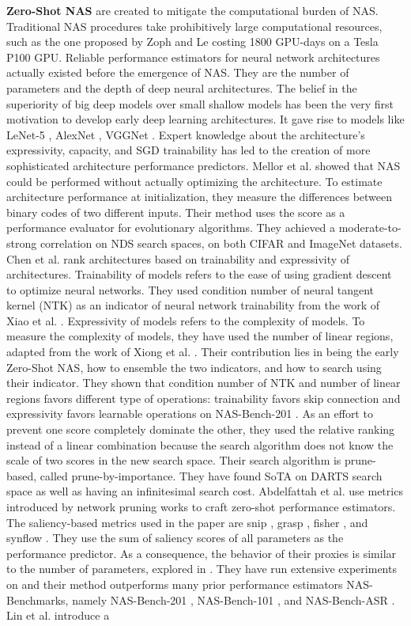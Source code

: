 \documentclass[lettersize,journal]{IEEEtran}
\begin{document}
\textbf {Zero-Shot NAS} are created to mitigate the computational burden of NAS. Traditional NAS procedures take prohibitively large computational resources, such as the one proposed by Zoph and Le \cite{rl1} costing 1800 GPU-days on a Tesla P100 GPU. Reliable performance estimators for neural network architectures actually existed before the emergence of NAS. They are the number of parameters and the depth of deep neural architectures. The belief in the superiority of big deep models over small shallow models has been the very first motivation to develop early deep learning architectures. It gave rise to models like LeNet-5 \cite{lenet}, AlexNet \cite{alexnet}, VGGNet \cite{vgg}. Expert knowledge about the architecture's expressivity, capacity, and SGD trainability has led to the creation of more sophisticated architecture performance predictors. Mellor et al. \cite{naswot} showed that NAS could be performed without actually optimizing the architecture. To estimate architecture performance at initialization, they measure the differences between binary codes of two different inputs. Their method uses the score as a performance evaluator for evolutionary algorithms. They achieved a moderate-to-strong correlation on NDS search spaces, on both CIFAR and ImageNet datasets. Chen et al. \cite{TE-NAS} rank architectures based on trainability and expressivity of architectures. Trainability of models refers to the ease of using gradient descent to optimize neural networks. They used condition number of neural tangent kernel (NTK) as an indicator of neural network trainability from the work of Xiao et al. \cite{Disentangling}. Expressivity of models refers to the complexity of models. To measure the complexity of models, they have used the number of linear regions, adapted from the work of Xiong et al. \cite{linearregion}. Their contribution lies in being the early Zero-Shot NAS, how to ensemble the two indicators, and how to search using their indicator. They shown that condition number of NTK and number of linear regions favors different type of operations: trainability favors skip connection and expressivity favors learnable operations on NAS-Bench-201 \cite{nb201}. As an effort to prevent one score completely dominate the other, they used the relative ranking instead of a linear combination because the search algorithm does not know the scale of two scores in the new search space. Their search algorithm is prune-based, called prune-by-importance. They have found SoTA on DARTS search space \cite{DARTS} as well as having an infinitesimal search cost. Abdelfattah et al. \cite{LightweightNAS} use metrics introduced by network pruning works to craft zero-shot performance estimators. The saliency-based metrics used in the paper are snip \cite{snip}, grasp \cite{grasp}, fisher \cite{fisher}, and synflow \cite{synflow}. They use the sum of saliency scores of all parameters as the performance predictor. As a consequence, the behavior of their proxies is similar to the number of parameters, explored in \cite{deeperlookzerocost}. They have run extensive experiments on and their method outperforms many prior performance estimators NAS-Benchmarks, namely NAS-Bench-201 \cite{nb201}, NAS-Bench-101 \cite{nb101}, and NAS-Bench-ASR \cite{nbasr}. Lin et al. \cite{Zen-NAS} introduce a 
\end{document}
